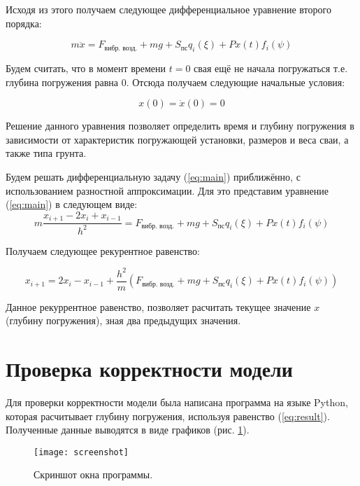 \noindent Исходя из этого получаем следующее дифференциальное уравнение второго порядка:

\begin{equation}
    \label{eq:main}
    m\ddot{x} = F_\text{вибр. возд.} + mg + S_\text{пс} q_i(\xi) + P x(t) f_i(\psi)
\end{equation}

\noindent Будем считать, что в момент времени $t = 0$ свая ещё не начала погружаться т.е.
глубина погружения равна 0. Отсюда получаем следующие начальные условия:

\begin{equation}
    x(0) = \dot{x}(0) = 0
\end{equation}

Решение данного уравнения позволяет определить время и глубину погружения в зависимости от характеристик погружающей
установки, размеров и веса сваи, а также типа грунта.

Будем решать дифференциальную задачу (\ref{eq:main}) приближённо, с использованием разностной аппроксимации.
Для это представим уравнение (\ref{eq:main}) в следующем виде:
\begin{equation}
        m\frac{x_{i+1} - 2x_i + x_{i-1}}{h^2} = F_\text{вибр. возд.} + mg + S_\text{пс} q_i(\xi)+ P x(t) f_i(\psi)
\end{equation}

Получаем следующее рекурентное равенство:

\begin{equation}
    \label{eq:result}
    x_{i+1} = 2x_i - x_{i-1} + \frac{h^2}{m}(F_\text{вибр. возд.} + mg + S_\text{пс} q_i(\xi) + P x(t) f_i(\psi))
\end{equation}

\noindent Данное рекуррентное равенство, позволяет расчитать текущее значение $x$ (глубину погружения), зная два предыдущих значения.

\clearpage

\section{Проверка корректности модели}

Для проверки корректности модели была написана программа на языке Python, которая расчитывает глубину
погружения, используя равенство (\ref{eq:result}). Полученные данные выводятся в виде графиков
(рис. \ref{fig:screenshot}).

\begin{figure}[ht]
    \centering
    \texttt{[image: screenshot]}
    \caption{Скриншот окна программы.}
    \label{fig:screenshot}
\end{figure}

